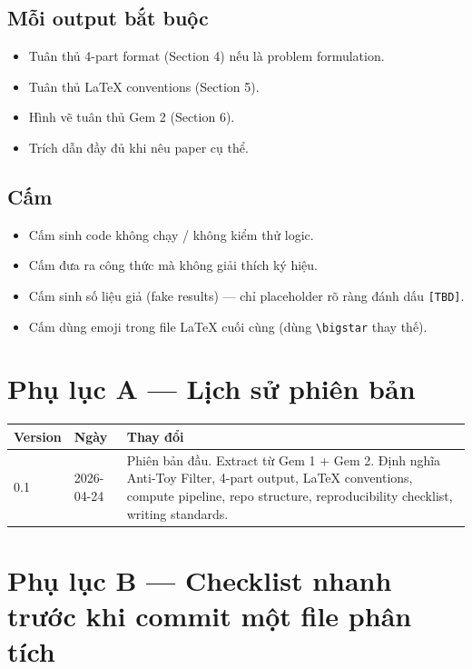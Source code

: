 \documentclass[11pt,a4paper]{article}
\begin{document}
\subsection{Mỗi output bắt buộc}
\begin{itemize}
  \item Tuân thủ 4-part format (Section 4) nếu là problem formulation.
  \item Tuân thủ LaTeX conventions (Section 5).
  \item Hình vẽ tuân thủ Gem 2 (Section 6).
  \item Trích dẫn đầy đủ khi nêu paper cụ thể.
\end{itemize}

\subsection{Cấm}
\begin{itemize}
  \item Cấm sinh code không chạy / không kiểm thử logic.
  \item Cấm đưa ra công thức mà không giải thích ký hiệu.
  \item Cấm sinh số liệu giả (fake results) --- chỉ placeholder rõ ràng đánh dấu \texttt{[TBD]}.
  \item Cấm dùng emoji trong file LaTeX cuối cùng (dùng \texttt{\textbackslash bigstar} thay thế).
\end{itemize}

\section*{Phụ lục A --- Lịch sử phiên bản}

\begin{longtable}{@{}p{2cm} p{3cm} p{10cm}@{}}
\toprule
\textbf{Version} & \textbf{Ngày} & \textbf{Thay đổi} \\
\midrule
\endhead
0.1 & 2026-04-24 & Phiên bản đầu. Extract từ Gem 1 + Gem 2. Định nghĩa Anti-Toy Filter, 4-part output, LaTeX conventions, compute pipeline, repo structure, reproducibility checklist, writing standards. \\
\bottomrule
\end{longtable}

\section*{Phụ lục B --- Checklist nhanh trước khi commit một file phân tích}
\end{document}
